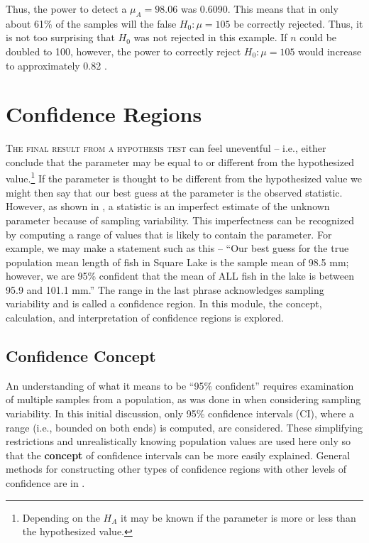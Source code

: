 \documentclass[10pt,openany]{book}\usepackage[]{graphicx}\usepackage[]{color}
\begin{document}
Thus, the power to detect a $\mu_{A}=98.06$ was 0.6090. This means that in only about 61\% of the samples will the false $H_{0}:\mu=105$ be correctly rejected. Thus, it is not too surprising that $H_{0}$ was not rejected in this example. If $n$ could be doubled to 100, however, the power to correctly reject $H_{0}:\mu=105$ would increase to approximately 0.82 .



\chapter{Confidence Regions} \label{chap:ConfidenceRegions}

\vspace*{-24pt}
\minitoc



\vspace*{24pt}
\lettrine{T}{he final result from a hypothesis test}  can feel uneventful -- i.e., either conclude that the parameter may be equal to or different from the hypothesized value.\footnote{Depending on the $H_{A}$ it may be known if the parameter is more or less than the hypothesized value.} If the parameter is thought to be different from the hypothesized value we might then say that our best guess at the parameter is the observed statistic. However, as shown in , a statistic is an imperfect estimate of the unknown parameter because of sampling variability. This imperfectness can be recognized by computing a range of values that is likely to contain the parameter. For example, we may make a statement such as this -- ``Our best guess for the true population mean length of fish in Square Lake is the sample mean of 98.5 mm; however, we are 95\% confident that the mean of ALL fish in the lake is between 95.9 and 101.1 mm.''  The range in the last phrase acknowledges sampling variability and is called a confidence region. In this module, the concept, calculation, and interpretation of confidence regions is explored.

\section{Confidence Concept}\label{sect:CIconcept}
An understanding of what it means to be ``95\% confident'' requires examination of multiple samples from a population, as was done in  when considering sampling variability. In this initial discussion, only 95\% confidence intervals (CI), where a range (i.e., bounded on both ends) is computed, are considered. These simplifying restrictions and unrealistically knowing population values are used here only so that the \textbf{concept} of confidence intervals can be more easily explained. General methods for constructing other types of confidence regions with other levels of confidence are in .
\end{document}
